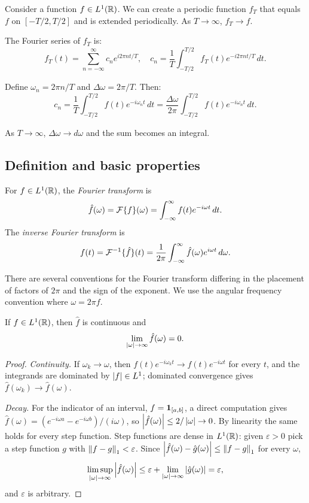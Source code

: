 \begin{notechapter}
Consider a function $f \in L^1(\mathbb{R})$. We can create a periodic function $f_T$ that equals $f$ on $[-T/2, T/2]$ and is extended periodically. As $T \to \infty$, $f_T \to f$.

The Fourier series of $f_T$ is:
\[
f_T(t) = \sum_{n=-\infty}^{\infty} c_n e^{i 2\pi n t/T}, \quad c_n = \frac{1}{T} \int_{-T/2}^{T/2} f_T(t) e^{-i 2\pi n t/T} \, dt.
\]

Define $\omega_n = 2\pi n/T$ and $\Delta \omega = 2\pi/T$. Then:
\[
c_n = \frac{1}{T} \int_{-T/2}^{T/2} f(t) e^{-i\omega_n t} \, dt = \frac{\Delta \omega}{2\pi} \int_{-T/2}^{T/2} f(t) e^{-i\omega_n t} \, dt.
\]

As $T \to \infty$, $\Delta \omega \to d\omega$ and the sum becomes an integral.

\subsection{Definition and basic properties}

\begin{definition}
For $f \in L^1(\mathbb{R})$, the \emph{Fourier transform} is
\[
\hat{f}(\omega) = \mathcal{F}\{f\}(\omega) = \int_{-\infty}^{\infty} f(t) e^{-i\omega t} \, dt.
\]
The \emph{inverse Fourier transform} is
\[
f(t) = \mathcal{F}^{-1}\{\hat{f}\}(t) = \frac{1}{2\pi} \int_{-\infty}^{\infty} \hat{f}(\omega) e^{i\omega t} \, d\omega.
\]
\end{definition}

\begin{remark}
There are several conventions for the Fourier transform differing in the placement of factors of $2\pi$ and the sign of the exponent. We use the angular frequency convention where $\omega = 2\pi f$.
\end{remark}

\begin{theorem}
If $f \in L^1(\mathbb{R})$, then $\hat{f}$ is continuous and
\[
\lim_{\left|\omega\right| \to \infty} \hat{f}(\omega) = 0.
\]
\end{theorem}

\begin{proof}
\emph{Continuity.} If $\omega_k \to \omega$, then $f(t)e^{-i\omega_k t} \to f(t)e^{-i\omega t}$ for every $t$, and the integrands are dominated by $\left|f\right| \in L^1$; dominated convergence gives $\hat f(\omega_k) \to \hat f(\omega)$.

\emph{Decay.} For the indicator of an interval, $f = \mathbf{1}_{[a,b]}$, a direct computation gives $\hat f(\omega) = (e^{-i\omega a} - e^{-i\omega b})/(i\omega)$, so $\left|\hat f(\omega)\right| \le 2/\left|\omega\right| \to 0$. By linearity the same holds for every step function. Step functions are dense in $L^1(\mathbb{R})$: given $\varepsilon > 0$ pick a step function $g$ with $\left\|f-g\right\|_1 < \varepsilon$. Since $\left|\hat f(\omega) - \hat g(\omega)\right| \le \left\|f-g\right\|_1$ for every $\omega$,
\[
\limsup_{\left|\omega\right|\to\infty} \left|\hat f(\omega)\right| \le \varepsilon + \lim_{\left|\omega\right|\to\infty}\left|\hat g(\omega)\right| = \varepsilon,
\]
and $\varepsilon$ is arbitrary.
\end{proof}


\end{notechapter}
